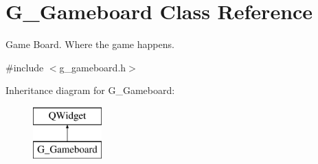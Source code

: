 \hypertarget{class_g___gameboard}{}\section{G\+\_\+\+Gameboard Class Reference}
\label{class_g___gameboard}


Game Board. Where the game happens.  




{\ttfamily \#include $<$g\+\_\+gameboard.\+h$>$}

Inheritance diagram for G\+\_\+\+Gameboard\+:\begin{figure}[H]
\begin{center}
\leavevmode
\includegraphics[height=2.000000cm]{class_g___gameboard}
\end{center}
\end{figure}

